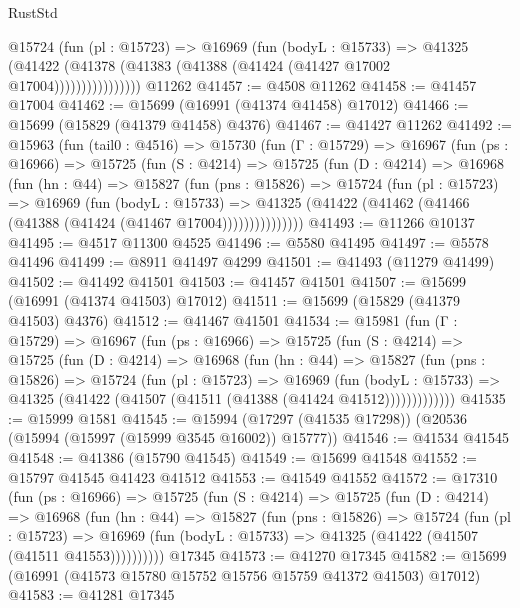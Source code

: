 \begin{lexlean}{RustStd}
\begin{coremodule}
                  @15724
                    (fun (pl : @15723) =>
                    @16969
                      (fun (bodyL : @15733) =>
                      @41325
                        (@41422
                          (@41378 (@41383 (@41388 (@41424 (@41427 @17002 @17004))))))))))))))))
    @11262
@41457 := @4508 @11262
@41458 := @41457 @17004
@41462 := @15699 (@16991 (@41374 @41458) @17012)
@41466 := @15699 (@15829 (@41379 @41458) @4376)
@41467 := @41427 @11262
@41492 := @15963
    (fun (tail0 : @4516) =>
    @15730
      (fun (Γ : @15729) =>
      @16967
        (fun (ps : @16966) =>
        @15725
          (fun (S : @4214) =>
          @15725
            (fun (D : @4214) =>
            @16968
              (fun (hn : @44) =>
              @15827
                (fun (pns : @15826) =>
                @15724
                  (fun (pl : @15723) =>
                  @16969
                    (fun (bodyL : @15733) =>
                    @41325 (@41422 (@41462 (@41466 (@41388 (@41424 (@41467 @17004)))))))))))))))
@41493 := @11266 @10137
@41495 := @4517 @11300 @4525
@41496 := @5580 @41495
@41497 := @5578 @41496
@41499 := @8911 @41497 @4299
@41501 := @41493 (@11279 @41499)
@41502 := @41492 @41501
@41503 := @41457 @41501
@41507 := @15699 (@16991 (@41374 @41503) @17012)
@41511 := @15699 (@15829 (@41379 @41503) @4376)
@41512 := @41467 @41501
@41534 := @15981
    (fun (Γ : @15729) =>
    @16967
      (fun (ps : @16966) =>
      @15725
        (fun (S : @4214) =>
        @15725
          (fun (D : @4214) =>
          @16968
            (fun (hn : @44) =>
            @15827
              (fun (pns : @15826) =>
              @15724
                (fun (pl : @15723) =>
                @16969
                  (fun (bodyL : @15733) =>
                  @41325 (@41422 (@41507 (@41511 (@41388 (@41424 @41512)))))))))))))
@41535 := @15999 @1581
@41545 := @15994 (@17297 (@41535 @17298)) (@20536 (@15994 (@15997 (@15999 @3545 @16002)) @15777))
@41546 := @41534 @41545
@41548 := @41386 (@15790 @41545)
@41549 := @15699 @41548
@41552 := @15797 @41545 @41423 @41512
@41553 := @41549 @41552
@41572 := @17310
    (fun (ps : @16966) =>
    @15725
      (fun (S : @4214) =>
      @15725
        (fun (D : @4214) =>
        @16968
          (fun (hn : @44) =>
          @15827
            (fun (pns : @15826) =>
            @15724
              (fun (pl : @15723) =>
              @16969 (fun (bodyL : @15733) => @41325 (@41422 (@41507 (@41511 @41553))))))))))
    @17345
@41573 := @41270 @17345
@41582 := @15699 (@16991 (@41573 @15780 @15752 @15756 @15759 @41372 @41503) @17012)
@41583 := @41281 @17345

\end{coremodule}
\end{lexlean}
